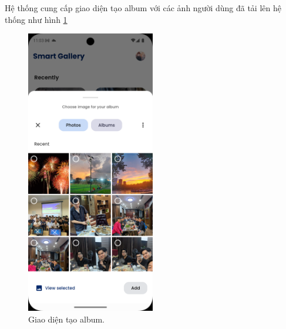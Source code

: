 Hệ thống cung cấp giao diện tạo album với các ảnh người dùng đã tải lên hệ thống như hình \ref{fig:create-album}

\begin{figure}[H]
    \centering  
    \includegraphics[width=0.5\textwidth]{figures/c4/4-2/create_album.png}
    \caption{Giao diện tạo album.}
    \label{fig:create-album}
\end{figure}